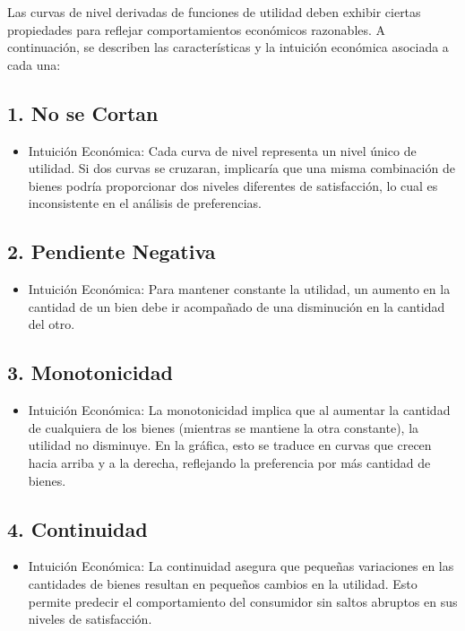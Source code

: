 \documentclass{article}
\begin{document}
Las curvas de nivel derivadas de funciones de utilidad deben exhibir ciertas propiedades para reflejar comportamientos económicos razonables. A continuación, se describen las características y la intuición económica asociada a cada una:

\subsection*{1. No se Cortan}
\begin{itemize}
    \item Intuición Económica: Cada curva de nivel representa un {\color{teal}nivel único de utilidad}. Si dos curvas se cruzaran, implicaría que una misma combinación de bienes podría proporcionar {\color{teal}dos niveles diferentes de satisfacción}, lo cual es inconsistente en el análisis de preferencias.
\end{itemize}

\subsection*{2. Pendiente Negativa}
\begin{itemize}
    \item Intuición Económica: Para mantener constante la utilidad, un aumento en la cantidad de un bien debe ir acompañado de una disminución en la cantidad del otro.
\end{itemize}

\subsection*{3. Monotonicidad}
\begin{itemize}
    \item Intuición Económica: La {\color{teal}monotonicidad} implica que al aumentar la cantidad de cualquiera de los bienes (mientras se mantiene la otra constante), la utilidad no disminuye. En la gráfica, esto se traduce en curvas que {\color{teal}crecen hacia arriba y a la derecha}, reflejando la preferencia por más cantidad de bienes.
\end{itemize}

\subsection*{4. Continuidad}
\begin{itemize}
    \item Intuición Económica: La {\color{teal}continuidad} asegura que pequeñas variaciones en las cantidades de bienes resultan en pequeños cambios en la utilidad. Esto permite predecir el comportamiento del consumidor sin {\color{teal}saltos abruptos} en sus niveles de satisfacción.
\end{itemize}
\end{document}
